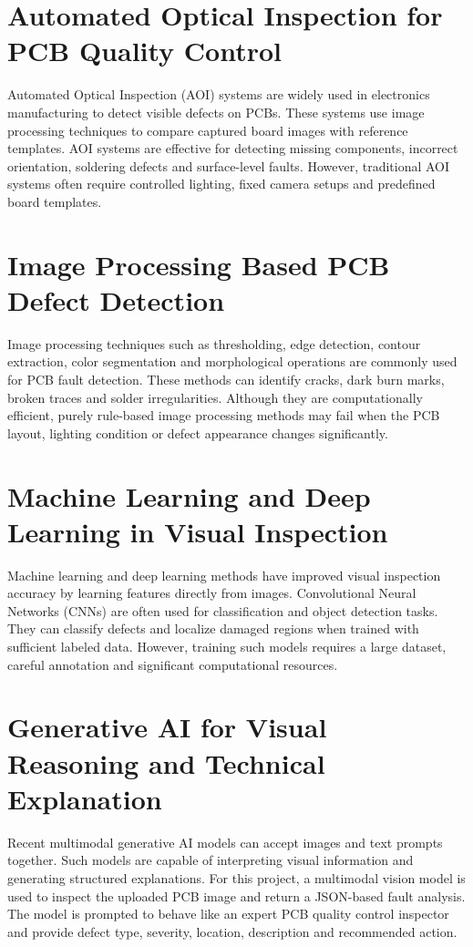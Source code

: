 \documentclass[12pt,a4paper]{report}
\begin{document}
\section{Automated Optical Inspection for PCB Quality Control}

Automated Optical Inspection (AOI) systems are widely used in electronics manufacturing to detect visible defects on PCBs. These systems use image processing techniques to compare captured board images with reference templates. AOI systems are effective for detecting missing components, incorrect orientation, soldering defects and surface-level faults. However, traditional AOI systems often require controlled lighting, fixed camera setups and predefined board templates.

\section{Image Processing Based PCB Defect Detection}

Image processing techniques such as thresholding, edge detection, contour extraction, color segmentation and morphological operations are commonly used for PCB fault detection. These methods can identify cracks, dark burn marks, broken traces and solder irregularities. Although they are computationally efficient, purely rule-based image processing methods may fail when the PCB layout, lighting condition or defect appearance changes significantly.

\section{Machine Learning and Deep Learning in Visual Inspection}

Machine learning and deep learning methods have improved visual inspection accuracy by learning features directly from images. Convolutional Neural Networks (CNNs) are often used for classification and object detection tasks. They can classify defects and localize damaged regions when trained with sufficient labeled data. However, training such models requires a large dataset, careful annotation and significant computational resources.

\section{Generative AI for Visual Reasoning and Technical Explanation}

Recent multimodal generative AI models can accept images and text prompts together. Such models are capable of interpreting visual information and generating structured explanations. For this project, a multimodal vision model is used to inspect the uploaded PCB image and return a JSON-based fault analysis. The model is prompted to behave like an expert PCB quality control inspector and provide defect type, severity, location, description and recommended action.
\end{document}
